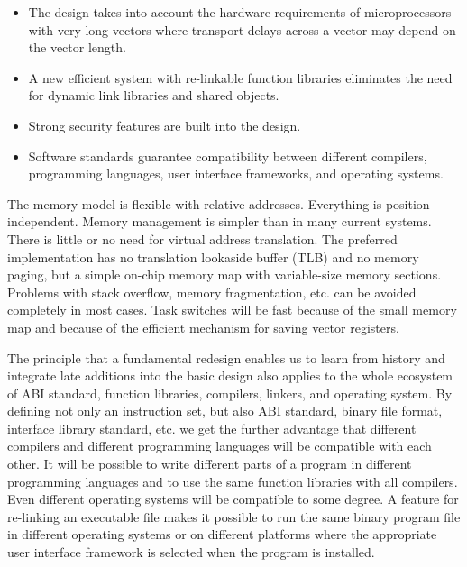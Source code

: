 \documentclass[forwardcom.tex]{subfiles}
\begin{document}
\begin{itemize}
\item The design takes into account the hardware requirements of microprocessors with very long vectors where transport delays across a vector may depend on the vector length.

\item A new efficient system with re-linkable function libraries eliminates the need for dynamic link libraries and shared objects. 

\item Strong security features are built into the design.

\item Software standards guarantee compatibility between different compilers, programming languages, user interface frameworks, and operating systems.

\end{itemize}

The memory model is flexible with relative addresses. Everything is position-independent. Memory management is simpler than in many current systems. 
There is little or no need for virtual address translation. The preferred implementation has no translation lookaside buffer (TLB) and no memory paging, but a simple on-chip memory map with variable-size memory sections. Problems with stack overflow, memory fragmentation, etc. can be avoided completely in most cases. Task switches will be fast because of the small memory map and because of the efficient mechanism for saving vector registers. 
\vv

The principle that a fundamental redesign enables us to learn from history and integrate late additions into the basic design also applies to the whole ecosystem of ABI standard, function libraries, compilers, linkers, and operating system. By defining not only an instruction set, but also ABI standard, binary file format, interface library standard, etc. we get the further advantage that different compilers and different programming languages will be compatible with each other. It will be possible to write different parts of a program in different programming languages and to use the same function libraries with all compilers. Even different operating systems will be compatible to some degree. A feature for re-linking an executable file makes it possible to run the same binary program file in different operating systems or on different platforms where the appropriate user interface framework is selected when the program is installed.
\vv
\end{document}
